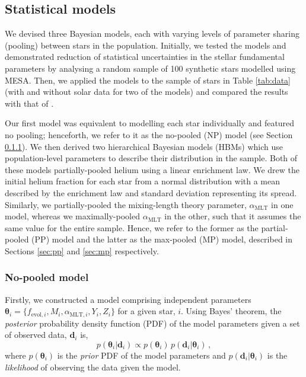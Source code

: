 \documentclass[fleqn,usenatbib]{mnras}
\newcommand{\mlt}{\ensuremath{{\alpha_\mathrm{MLT}}}}
\begin{document}
\subsection{Statistical models}\label{sec:hbm}



We devised three Bayesian models, each with varying levels of parameter sharing (pooling) between stars in the population. Initially, we tested the models and demonstrated reduction of statistical uncertainties in the stellar fundamental parameters by analysing a random sample of 100 synthetic stars modelled using \textsc{MESA}. Then, we applied the models to the sample of stars in Table \ref{tab:data} (with and without solar data for two of the models) and compared the results with that of .

Our first model was equivalent to modelling each star individually and featured no pooling; henceforth, we refer to it as the no-pooled (NP) model (see Section \ref{sec:np}). We then derived two hierarchical Bayesian models (HBMs) which use population-level parameters to describe their distribution in the sample. Both of these models partially-pooled helium using a linear enrichment law. We drew the initial helium fraction for each star from a normal distribution with a mean described by the enrichment law and standard deviation representing its spread. Similarly, we partially-pooled the mixing-length theory parameter, $\mlt$ in one model, whereas we maximally-pooled $\mlt$ in the other, such that it assumes the same value for the entire sample. Hence, we refer to the former as the partial-pooled (PP) model and the latter as the max-pooled (MP) model, described in Sections \ref{sec:pp} and \ref{sec:mp} respectively.

\subsubsection{No-pooled model}\label{sec:np}

Firstly, we constructed a model comprising independent parameters $\boldsymbol{\theta}_i = \{f_{\mathrm{evol}, i}, M_i, \alpha_{\mathrm{MLT},i}, Y_i, Z_i\}$ for a given star, $i$. Using Bayes' theorem, the \emph{posterior} probability density function (PDF) of the model parameters given a set of observed data, $\boldsymbol{d}_i$ is,
%
\begin{equation}
    p(\boldsymbol{\theta}_i | \boldsymbol{d}_i) \propto p(\boldsymbol{\theta}_i) \, p(\boldsymbol{d}_i | \boldsymbol{\theta}_i)\,,
    \label{eq:bayes}
\end{equation}
%
where $p(\boldsymbol{\theta}_i)$ is the \emph{prior} PDF of the model parameters and $p(\boldsymbol{d}_i | \boldsymbol{\theta}_i)$ is the \emph{likelihood} of observing the data given the model.
\end{document}
